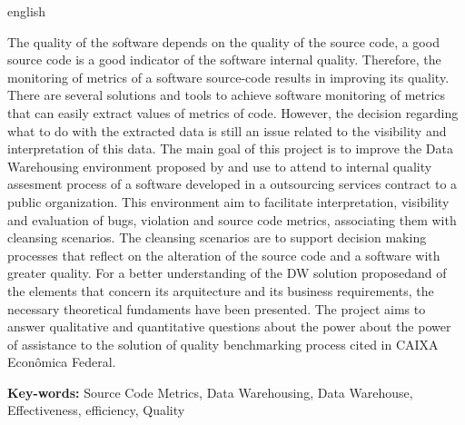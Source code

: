 \begin{resumo}[Abstract]
 \begin{otherlanguage*}{english}
 
The quality of the software depends on the quality of the source code, a good source code is a good indicator of the software internal quality. Therefore, the monitoring of metrics of a software source-code results in improving its quality. There are several solutions and tools to achieve software monitoring of metrics that can easily extract values of metrics of code. However, the decision regarding what to do with the extracted data is still an issue related to the visibility and interpretation of this data. The main goal of this project is to improve the  Data Warehousing environment proposed by    and use to attend to internal quality assesment process of a software developed in a outsourcing services contract to a public organization. This environment aim to facilitate interpretation, visibility and evaluation of bugs, violation and source code metrics, associating them with cleansing scenarios. The cleansing scenarios are to support decision making processes that reflect on the alteration of the source code and a software with greater quality. For a better understanding of the DW solution proposedand of the elements that concern its arquitecture and its business requirements, the necessary theoretical fundaments have been presented. The project aims to answer qualitative and quantitative questions about the power about the power of
assistance to the solution of quality benchmarking process cited in CAIXA Econômica Federal.
 
\textbf{Key-words:} Source Code Metrics,  Data Warehousing, Data Warehouse, Effectiveness, 	 efficiency, Quality

 \end{otherlanguage*}
\end{resumo}